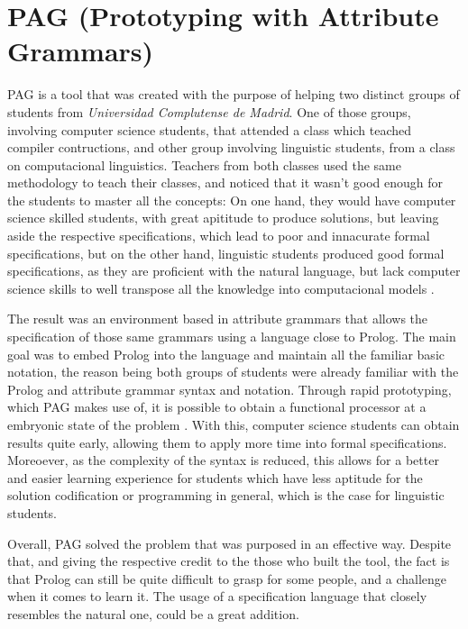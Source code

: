 \section{PAG (Prototyping with Attribute Grammars)}
PAG is a tool that was created with the purpose of helping two distinct groups of students from \emph{Universidad Complutense de Madrid}. 
One of those groups, involving computer science students, that attended a class which teached compiler contructions, and other group involving linguistic students, from a class on computacional linguistics. 
Teachers from both classes used the same methodology to teach their classes, 
and noticed that it wasn't good enough for the students to master all the concepts: On one hand, they would have computer science skilled students, 
with great apititude to produce solutions, but leaving aside the respective specifications, which lead to poor and innacurate formal specifications, but on the other hand, 
linguistic students produced good formal specifications, as they are proficient with the natural language,
but lack computer science skills to well transpose all the knowledge into computacional models \cite{sierra_2006}.
	
The result was an environment based in attribute grammars that allows the specification of those same grammars using a language close to Prolog. 
The main goal was to embed Prolog into the language and maintain all the familiar basic notation, 
the reason being both groups of students were already familiar with the Prolog and attribute grammar syntax and notation. 
Through rapid prototyping, which PAG makes use of, it is possible to obtain a functional processor at a embryonic state of the problem \cite{sierra_2006}. 
With this, computer science students can obtain results quite early, allowing them to apply more time into formal specifications. 
Moreoever, as the complexity of the syntax is reduced, this allows for a better and easier learning experience for students which have less aptitude for the solution codification or programming in general, 
which is the case for linguistic students.

Overall, PAG solved the problem that was purposed in an effective way. 
Despite that, and giving the respective credit to the those who built the tool, the fact is that Prolog can still be quite difficult to grasp for some people, and a challenge when it comes to learn it. 
The usage of a specification language that closely resembles the natural one, could be a great addition.


